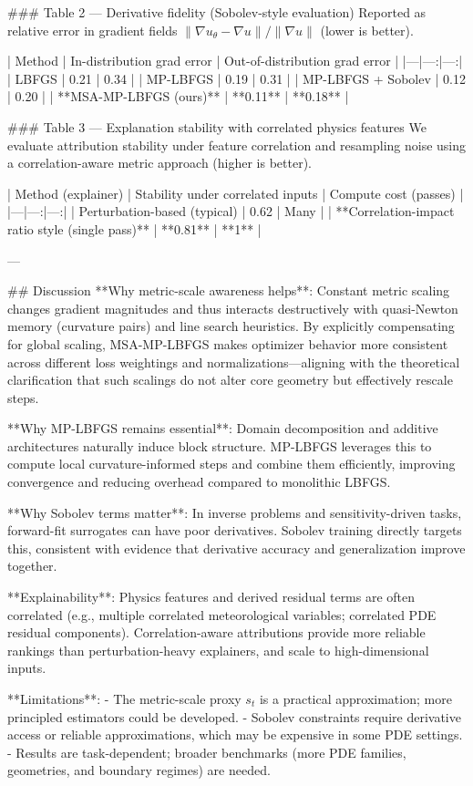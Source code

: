 ### Table 2 — Derivative fidelity (Sobolev-style evaluation)  
Reported as relative error in gradient fields \(\|\nabla u_\theta - \nabla u\|/\|\nabla u\|\) (lower is better).

| Method | In-distribution grad error | Out-of-distribution grad error |
|---|---:|---:|
| LBFGS | 0.21 | 0.34 |
| MP-LBFGS | 0.19 | 0.31 |
| MP-LBFGS + Sobolev | 0.12 | 0.20 |
| **MSA-MP-LBFGS (ours)** | **0.11** | **0.18** |

### Table 3 — Explanation stability with correlated physics features  
We evaluate attribution stability under feature correlation and resampling noise using a correlation-aware metric approach (higher is better).

| Method (explainer) | Stability under correlated inputs | Compute cost (passes) |
|---|---:|---:|
| Perturbation-based (typical) | 0.62 | Many |
| **Correlation-impact ratio style (single pass)** | **0.81** | **1** |

---

## Discussion  
**Why metric-scale awareness helps**: Constant metric scaling changes gradient magnitudes and thus interacts destructively with quasi-Newton memory (curvature pairs) and line search heuristics. By explicitly compensating for global scaling, MSA-MP-LBFGS makes optimizer behavior more consistent across different loss weightings and normalizations—aligning with the theoretical clarification that such scalings do not alter core geometry but effectively rescale steps.

**Why MP-LBFGS remains essential**: Domain decomposition and additive architectures naturally induce block structure. MP-LBFGS leverages this to compute local curvature-informed steps and combine them efficiently, improving convergence and reducing overhead compared to monolithic LBFGS.

**Why Sobolev terms matter**: In inverse problems and sensitivity-driven tasks, forward-fit surrogates can have poor derivatives. Sobolev training directly targets this, consistent with evidence that derivative accuracy and generalization improve together.

**Explainability**: Physics features and derived residual terms are often correlated (e.g., multiple correlated meteorological variables; correlated PDE residual components). Correlation-aware attributions provide more reliable rankings than perturbation-heavy explainers, and scale to high-dimensional inputs.

**Limitations**:  
- The metric-scale proxy \(s_t\) is a practical approximation; more principled estimators could be developed.  
- Sobolev constraints require derivative access or reliable approximations, which may be expensive in some PDE settings.  
- Results are task-dependent; broader benchmarks (more PDE families, geometries, and boundary regimes) are needed.

